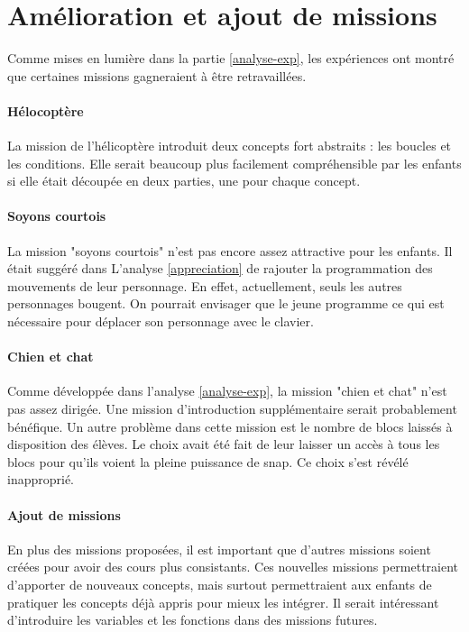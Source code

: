 \section{Amélioration et ajout de missions}
Comme mises en lumière dans la partie \ref{analyse-exp}, les expériences ont montré que certaines \glspl{mission} gagneraient à être retravaillées.

\paragraph{Hélocoptère}
La \gls{mission} de l'hélicoptère introduit deux concepts fort abstraits : les boucles et les conditions. Elle serait beaucoup plus facilement compréhensible par les enfants si elle était découpée en deux parties, une pour chaque concept.

\paragraph{Soyons courtois}
La \gls{mission} "soyons courtois" n'est pas encore assez attractive pour les enfants. Il était suggéré dans L'analyse \ref{appreciation} de rajouter la programmation des mouvements de leur personnage. En effet, actuellement, seuls les autres personnages bougent. On pourrait envisager que le jeune programme ce qui est nécessaire pour déplacer son personnage avec le clavier.

\paragraph{Chien et chat}
Comme développée dans l'analyse \ref{analyse-exp}, la \gls{mission} "chien et chat" n'est pas assez dirigée. Une \gls{mission} d'introduction supplémentaire serait probablement bénéfique. Un autre problème dans cette \gls{mission} est le nombre de \glspl{bloc} laissés à disposition des élèves. Le choix avait été fait de leur laisser un accès à tous les \glspl{bloc} pour qu'ils voient la pleine puissance de \gls{snap}. Ce choix s'est révélé inapproprié. 

\paragraph{Ajout de missions}
En plus des \glspl{mission} proposées, il est important que d'autres \glspl{mission} soient créées pour avoir des cours plus consistants. Ces nouvelles \glspl{mission} permettraient d'apporter de nouveaux concepts, mais surtout permettraient aux enfants de pratiquer les concepts déjà appris pour mieux les intégrer. Il serait intéressant d'introduire les variables et les fonctions dans des \glspl{mission} futures.

